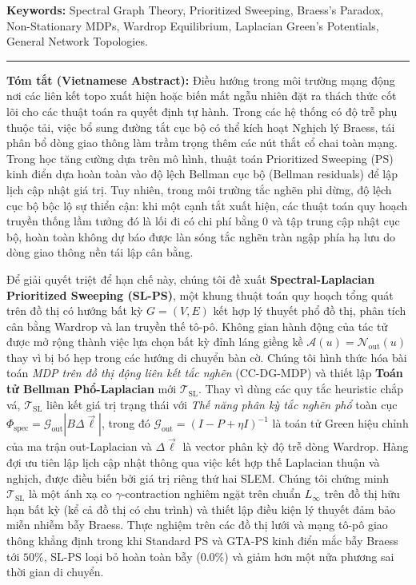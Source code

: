 \documentclass[11pt,a4paper]{article}
\begin{document}
\vspace{0.5em}
\noindent\textbf{Keywords:} Spectral Graph Theory, Prioritized Sweeping, Braess's Paradox, Non-Stationary MDPs, Wardrop Equilibrium, Laplacian Green's Potentials, General Network Topologies.

\vspace{1em}
\begin{center}
\rule{0.8\textwidth}{0.4pt}
\end{center}
\vspace{0.5em}

\noindent\textbf{Tóm tắt (Vietnamese Abstract):}
Điều hướng trong môi trường mạng động nơi các liên kết topo xuất hiện hoặc biến mất ngẫu nhiên đặt ra thách thức cốt lõi cho các thuật toán ra quyết định tự hành. Trong các hệ thống có độ trễ phụ thuộc tải, việc bổ sung đường tắt cục bộ có thể kích hoạt Nghịch lý Braess, tái phân bổ dòng giao thông làm trầm trọng thêm các nút thắt cổ chai toàn mạng. Trong học tăng cường dựa trên mô hình, thuật toán Prioritized Sweeping (PS) kinh điển dựa hoàn toàn vào độ lệch Bellman cục bộ (Bellman residuals) để lập lịch cập nhật giá trị. Tuy nhiên, trong môi trường tắc nghẽn phi dừng, độ lệch cục bộ bộc lộ sự thiển cận: khi một cạnh tắt xuất hiện, các thuật toán quy hoạch truyền thống lầm tưởng đó là lối đi có chi phí bằng 0 và tập trung cập nhật cục bộ, hoàn toàn không dự báo được làn sóng tắc nghẽn tràn ngập phía hạ lưu do dòng giao thông nền tái lập cân bằng.

Để giải quyết triệt để hạn chế này, chúng tôi đề xuất \textbf{Spectral-Laplacian Prioritized Sweeping (SL-PS)}, một khung thuật toán quy hoạch tổng quát trên đồ thị có hướng bất kỳ $G = (V, E)$ kết hợp lý thuyết phổ đồ thị, phân tích cân bằng Wardrop và lan truyền thế tô-pô. Không gian hành động của tác tử được mở rộng thành việc lựa chọn bất kỳ đỉnh láng giềng kề $\mathcal{A}(u) = \mathcal{N}_{\text{out}}(u)$ thay vì bị bó hẹp trong các hướng di chuyển bàn cờ. Chúng tôi hình thức hóa bài toán \textit{MDP trên đồ thị động liên kết tắc nghẽn} (CC-DG-MDP) và thiết lập \textbf{Toán tử Bellman Phổ-Laplacian} mới $\mathcal{T}_{\text{SL}}$. Thay vì dùng các quy tắc heuristic chắp vá, $\mathcal{T}_{\text{SL}}$ liên kết giá trị trạng thái với \textit{Thế năng phân kỳ tắc nghẽn phổ} toàn cục $\Phi_{\text{spec}} = \mathcal{G}_{\text{out}} |B \Delta \vec{\ell}|$, trong đó $\mathcal{G}_{\text{out}} = (I - P + \eta I)^{-1}$ là toán tử Green hiệu chỉnh của ma trận out-Laplacian và $\Delta \vec{\ell}$ là vector phân kỳ độ trễ dòng Wardrop. Hàng đợi ưu tiên lập lịch cập nhật thông qua việc kết hợp thế Laplacian thuận và nghịch, được điều biến bởi giá trị riêng thứ hai SLEM. Chúng tôi chứng minh $\mathcal{T}_{\text{SL}}$ là một ánh xạ co $\gamma$-contraction nghiêm ngặt trên chuẩn $L_\infty$ trên đồ thị hữu hạn bất kỳ (kể cả đồ thị có chu trình) và thiết lập điều kiện lý thuyết đảm bảo miễn nhiễm bẫy Braess. Thực nghiệm trên các đồ thị lưới và mạng tô-pô giao thông khẳng định trong khi Standard PS và GTA-PS kinh điển mắc bẫy Braess tới $50\%$, SL-PS loại bỏ hoàn toàn bẫy ($0.0\%$) và giảm hơn một nửa phương sai thời gian di chuyển.
\end{document}
